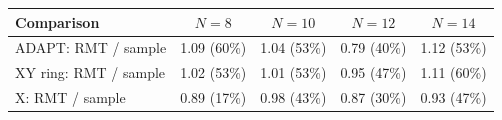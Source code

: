 \begin{tabular}{lcccc}
\toprule
Comparison & $N=8$ & $N=10$ & $N=12$ & $N=14$ \\
\midrule
ADAPT: RMT / sample & 1.09 (60\%) & 1.04 (53\%) & 0.79 (40\%) & 1.12 (53\%) \\
XY ring: RMT / sample & 1.02 (53\%) & 1.01 (53\%) & 0.95 (47\%) & 1.11 (60\%) \\
X: RMT / sample & 0.89 (17\%) & 0.98 (43\%) & 0.87 (30\%) & 0.93 (47\%) \\
\bottomrule
\end{tabular}
